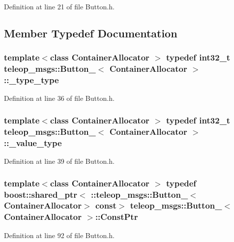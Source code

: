 Definition at line 21 of file Button.h.



\subsection{Member Typedef Documentation}
\subsubsection[{\_\-type\_\-type}]{\setlength{\rightskip}{0pt plus 5cm}template$<$class ContainerAllocator $>$ typedef int32\_\-t {\bf teleop\_\-msgs::Button\_\-}$<$ ContainerAllocator $>$::{\bf \_\-type\_\-type}}\label{structteleop__msgs_1_1Button___a53485e95f8ab884534030b3a5fbe749f}


Definition at line 36 of file Button.h.

\subsubsection[{\_\-value\_\-type}]{\setlength{\rightskip}{0pt plus 5cm}template$<$class ContainerAllocator $>$ typedef int32\_\-t {\bf teleop\_\-msgs::Button\_\-}$<$ ContainerAllocator $>$::{\bf \_\-value\_\-type}}\label{structteleop__msgs_1_1Button___a69dd9821814bf9d1b62d3eacd46c2623}


Definition at line 39 of file Button.h.

\subsubsection[{ConstPtr}]{\setlength{\rightskip}{0pt plus 5cm}template$<$class ContainerAllocator $>$ typedef boost::shared\_\-ptr$<$ ::{\bf teleop\_\-msgs::Button\_\-}$<$ContainerAllocator$>$ const$>$ {\bf teleop\_\-msgs::Button\_\-}$<$ ContainerAllocator $>$::{\bf ConstPtr}}\label{structteleop__msgs_1_1Button___a7ab38b0c8f0b011b9ea38fabf0ad93b8}


Definition at line 92 of file Button.h.

